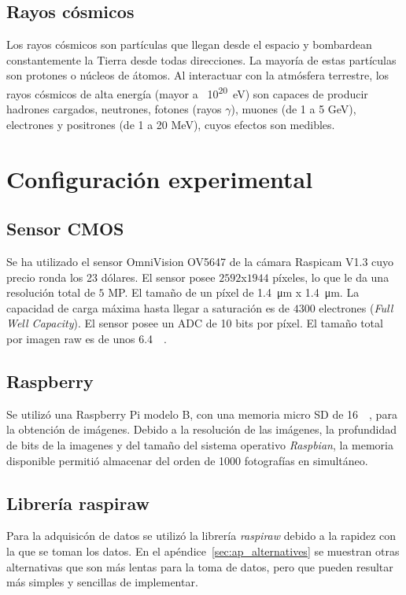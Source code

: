 \documentclass[twoside,twocolumn]{article}
\begin{document}
    \subsection{Rayos cósmicos}\label{sec:intro:cosmic_ray}
      Los rayos cósmicos son partículas que llegan desde el espacio y bombardean constantemente la Tierra desde todas direcciones.
      La mayoría de estas partículas son protones o núcleos de átomos.
      Al interactuar con la atmósfera terrestre, los rayos cósmicos de alta energía (mayor a \SI{}{10^{20}\eV})
      son capaces de producir hadrones cargados, neutrones, fotones (rayos $\gamma$),
      muones (de 1 a 5 \si{\giga \eV}), electrones y positrones (de 1 a 20 \si{\mega \eV}), \cite{GriederCRAE}
      cuyos efectos son medibles.
  

  \section{Configuración experimental}\label{sec:conf_exp}

    \subsection{Sensor CMOS}\label{sec:conf_exp:CMOS}
      Se ha utilizado el sensor OmniVision OV5647 de la cámara Raspicam V1.3 cuyo precio ronda los 23 dólares.
      El sensor posee	$2592$x$1944$ píxeles, lo que le da una resolución total de $5$ MP.
      El tamaño de un píxel de \SI{1.4}{\micro\meter} x \SI{1.4}{\micro\meter}.
      La capacidad de carga máxima hasta llegar a saturación es de $4300$ electrones (\emph{Full Well Capacity}).
      El sensor posee un ADC de 10 bits por píxel.
      El tamaño total por imagen raw es de unos \SI{6.4}{\mega\byte}.

    \subsection{Raspberry}\label{sec:conf_exp:raspberry}
      Se utilizó una Raspberry Pi modelo B, con una memoria micro SD de \SI{16}{\giga\byte}, para la obtención de imágenes.
      Debido a la resolución de las imágenes, la profundidad de bits de la imagenes y del tamaño del sistema operativo \emph{Raspbian}, 
      la memoria disponible permitió almacenar del orden de 1000 fotografías en simultáneo.

    \subsection{Librería raspiraw}\label{sec:conf_exp:raspiraw}
      Para la adquisicón de datos se utilizó la librería {\it raspiraw}\cite{raspiraw} debido a la rapidez con la que se toman los datos.
      En el apéndice~\ref{sec:ap_alternatives} se muestran otras alternativas que son más lentas para la toma de datos,
      pero que pueden resultar más simples y sencillas de implementar.
\end{document}
